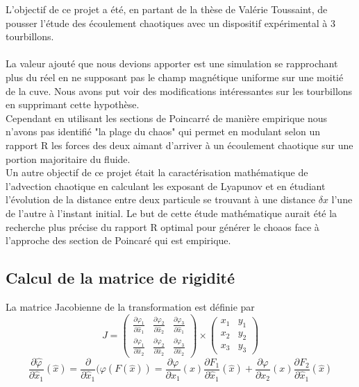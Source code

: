 \documentclass[a4paper,12pt,titlepage]{report}
\begin{document}
\begin{onehalfspace}
L'objectif de ce projet a été, en partant de la thèse de Valérie Toussaint, de pousser l'étude des écoulement chaotiques avec un dispositif expérimental à 3 tourbillons. \\
\\
La valeur ajouté que nous devions apporter est une simulation se rapprochant plus du réel en ne supposant pas le champ magnétique uniforme sur une moitié de la cuve. Nous avons put voir des modifications intéressantes sur les  tourbillons en supprimant cette hypothèse.\\
Cependant en utilisant les sections de Poincarré de manière empirique nous n'avons pas identifié "la plage du chaos" qui permet en modulant selon un rapport R les forces des deux aimant d'arriver à un écoulement chaotique sur une portion majoritaire du fluide. \\
Un autre objectif de ce projet était la caractérisation mathématique de l'advection chaotique en calculant les exposant de Lyapunov et en étudiant l'évolution de la distance entre deux particule se trouvant à une distance $\delta x$ l'une de l'autre à l'instant initial. Le but de cette étude mathématique aurait été la recherche plus précise du rapport R optimal pour générer le choaos face à l'approche des section de Poincaré qui est empirique.

\begin{appendix}

\chapter{Calcul de la matrice de rigidité}
\label{annexe_1}

La matrice Jacobienne de la transformation est définie par
\[	
J =
\begin{pmatrix}
  \frac{\partial\varphi_{1}}{\partial \hat{x}_{1}} & \frac{\partial\varphi_{2}}{\partial \hat{x}_{2}}  & \frac{\partial\varphi_{3}}{\partial \hat{x}_{1}}\\ 
  \frac{\partial\varphi_{1}}{\partial \hat{x}_{2}} & \frac{\partial \varphi_{2}}{\partial \hat{x}_{2}} & \frac{\partial\varphi_{3}}{\partial \hat{x}_{2}} 
\end{pmatrix} 
\times
\begin{pmatrix}
   x_{1} &  y_{1} \\
   x_{2} &  y_{2} \\
   x_{3} &  y_{3}
\end{pmatrix}
\]
\[
\frac{\partial \hat{\varphi}}{\partial \hat{x}_{1}}(\hat{x}) = 
\frac{\partial}{\partial \hat{x}_{1}}(\varphi(F(\hat{x})) = 
\frac{\partial \varphi}{\partial x_{1}}(x) \frac{\partial F_{1}}{\partial \hat{x}_{1}}(\hat{x}) +
\frac{\partial \varphi}{\partial x_{2}}(x) \frac{\partial F_{2}}{\partial \hat{x}_{1}}(\hat{x})
\]


\end{appendix}
\end{onehalfspace}
\end{document}
